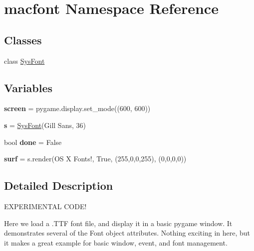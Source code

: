 \hypertarget{namespacemacfont}{}\section{macfont Namespace Reference}
\label{namespacemacfont}
\subsection*{Classes}
\begin{DoxyCompactItemize}
\item 
class \hyperlink{classmacfont_1_1_sys_font}{Sys\+Font}
\end{DoxyCompactItemize}
\subsection*{Variables}
\begin{DoxyCompactItemize}
\item 
\mbox{\label{namespacemacfont_a8f05b732016103d462cf8b107112de7e}} 
{\bfseries screen} = pygame.\+display.\+set\+\_\+mode((600, 600))
\item 
\mbox{\label{namespacemacfont_a016eeed1a1b067d035ccaec05d700f28}} 
{\bfseries s} = \hyperlink{classmacfont_1_1_sys_font}{Sys\+Font}(\textquotesingle{}Gill Sans\textquotesingle{}, 36)
\item 
\mbox{\label{namespacemacfont_a537cc5bf632337db49c06eda5f47e21f}} 
bool {\bfseries done} = False
\item 
\mbox{\label{namespacemacfont_aebaafef89b10b4824a5432d3912bc147}} 
{\bfseries surf} = s.\+render(\textquotesingle{}OS X Fonts!\textquotesingle{}, True, (255,0,0,255), (0,0,0,0))
\end{DoxyCompactItemize}


\subsection{Detailed Description}
\begin{DoxyVerb}EXPERIMENTAL CODE!

Here we load a .TTF font file, and display it in
a basic pygame window. It demonstrates several of the
Font object attributes. Nothing exciting in here, but
it makes a great example for basic window, event, and
font management.
\end{DoxyVerb}
 